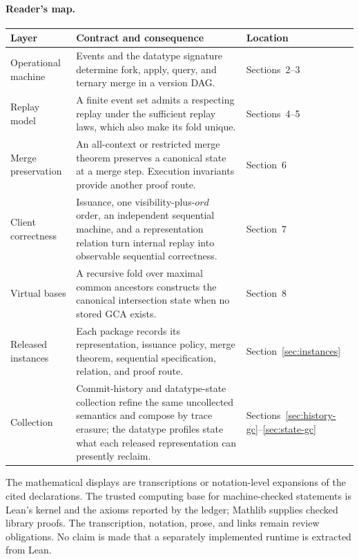 \documentclass[11pt]{article}
\theoremstyle{definition}
\begin{document}
\paragraph{Reader's map.}
\renewcommand{\arraystretch}{1.08}
\begin{longtable}{@{}>{\raggedright\arraybackslash}p{}
  >{\raggedright\arraybackslash}p{}
  >{\raggedright\arraybackslash}p{}@{}}
\toprule
Layer & Contract and consequence & Location\\
\midrule
\endhead
Operational machine & Events and the datatype signature determine fork,
apply, query, and ternary merge in a version DAG. & Sections~2--3\\
Replay model & A finite event set admits a respecting replay under the
sufficient replay laws, which also make its fold unique. & Sections~4--5\\
Merge preservation & An all-context or restricted merge theorem preserves
a canonical state at a merge step. Execution invariants provide another
proof route. & Section~6\\
Client correctness & Issuance, one visibility-plus-$ord$ order, an independent
sequential machine, and a representation relation turn internal replay into
observable sequential correctness. & Section~7\\
Virtual bases & A recursive fold over maximal common ancestors constructs the
canonical intersection state when no stored GCA exists. & Section~8\\
Released instances & Each package records its representation, issuance
policy, merge theorem, sequential specification, relation, and proof route. &
Section~\ref{sec:instances}\\
Collection & Commit-history and datatype-state collection refine the same
uncollected semantics and compose by trace erasure; the datatype profiles
state what each released representation can presently reclaim. &
Sections~\ref{sec:history-gc}--\ref{sec:state-gc}\\
\bottomrule
\end{longtable}
\renewcommand{\arraystretch}{1}

The mathematical displays are transcriptions or notation-level expansions of
the cited declarations. The trusted computing base for machine-checked
statements is Lean's kernel and the axioms reported by the ledger; Mathlib
supplies checked library proofs. The transcription, notation, prose,
and links remain review obligations. No claim is made that a separately
implemented runtime is extracted from Lean.
\end{document}
